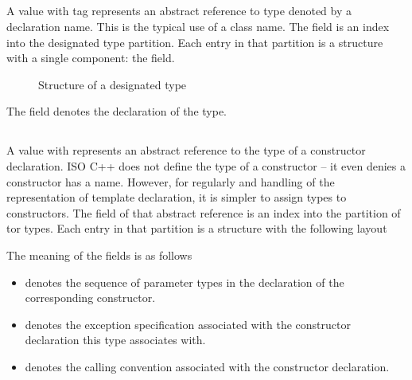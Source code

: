 \subsection{}
\label{sec:ifc:TypeSort:Designated}

A  value with tag  represents an
abstract reference to type denoted by a declaration name.  This is the typical use of a class name.
The  field is an index into the designated type partition.
Each entry in that partition is a structure with a single component: the  field.
%
\begin{figure}[H]
	\centering
	\caption{Structure of a designated type}
	\label{fig:ifc-designated-type-structure}
\end{figure}
%
The  field denotes the declaration of the type.


\subsection{}
\label{sec:ifc:TypeSort:Tor}

A  value with  represents an abstract reference to
the type of a constructor declaration.  ISO C++ does not define the type of a constructor -- it even denies
a constructor has a name.  However, for regularly and handling of the representation of 
template declaration, it is simpler to assign types to constructors.
The  field of that abstract reference is an index into the partition of tor types.
Each entry in that partition is a structure with the following layout
%
\begin{Structure}
	\caption{Structure of a tor type}
	\label{fig:ifc:TypeSort:Tor}
\end{Structure}
%
The meaning of the fields is as follows
\begin{itemize}
	\item {} denotes the sequence of parameter types in the declaration of the corresponding constructor.
	\item {} denotes the exception specification associated with the constructor declaration this type associates with.
	\item {} denotes the calling convention associated with the constructor declaration.
\end{itemize}

